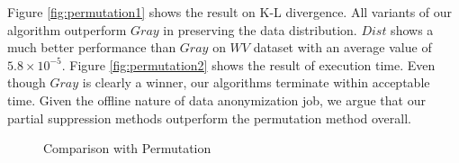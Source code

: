 Figure \ref{fig:permutation1} shows the result on K-L divergence.
All variants of our algorithm outperform $Gray$ in
preserving the data distribution. $Dist$ shows
a much better performance than $Gray$ on $WV$ dataset with an
average value of $5.8 \times 10 ^{-5}$.
Figure \ref{fig:permutation2} shows the result of execution time.
Even though $Gray$ is clearly a winner, our algorithms
terminate within acceptable time.
Given the offline nature of data anonymization job,
we argue that our partial suppression methods outperform the permutation method
overall.

\begin{figure}[th]
\centering
{}
\caption{Comparison with Permutation }
\end{figure}

